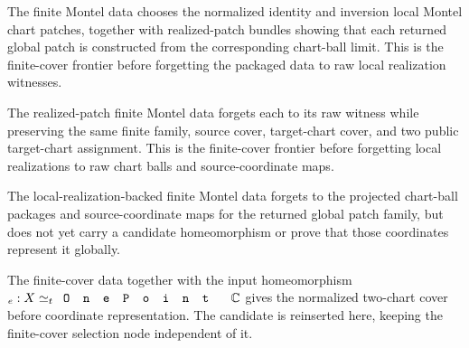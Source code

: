 \begin{lemma}
\label{lem:montel-normalized-limit-two-chart-cover-with-realized-patches}
The finite Montel data chooses the normalized identity and inversion local
Montel chart patches, together with realized-patch bundles showing that each
returned global patch is constructed from the corresponding chart-ball limit.
This is the finite-cover frontier before forgetting the packaged
 data to raw local realization witnesses.
\end{lemma}

\begin{lemma}
\label{lem:montel-normalized-limit-two-chart-cover-with-local-realizations}
The realized-patch finite Montel data forgets each
 to its raw
 witness while preserving the same
finite family, source cover, target-chart cover, and two public target-chart
assignment. This is the finite-cover frontier before forgetting local
realizations to raw chart balls and source-coordinate maps.
\end{lemma}

\begin{lemma}
\label{lem:montel-normalized-limit-two-chart-cover-without-candidate}
The local-realization-backed finite Montel data forgets to the projected
chart-ball packages and source-coordinate maps for the returned global patch
family, but does not yet carry a candidate homeomorphism or prove that those
coordinates represent it globally.
\end{lemma}

\begin{lemma}
\label{lem:montel-normalized-limit-two-chart-cover-without-coord-rep}
The finite-cover data together with the input homeomorphism
\(_e : X \simeq_t \code{OnePoint}\,\C\) gives the normalized two-chart cover
before coordinate representation. The candidate is reinserted here, keeping the
finite-cover selection node independent of it.
\end{lemma}

